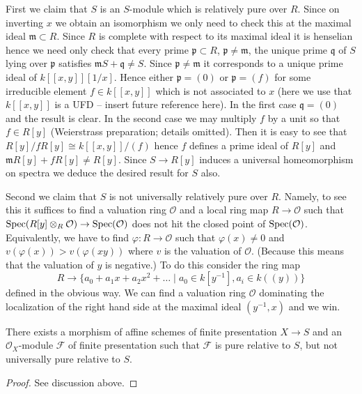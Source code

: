 \medskip\noindent
First we claim that $S$ is an $S$-module which is relatively pure
over $R$. Since on inverting $x$ we obtain an isomorphism we only need
to check this at the maximal ideal $\mathfrak m \subset R$. Since
$R$ is complete with respect to its maximal ideal it is henselian
hence we need only check that every prime $\mathfrak p \subset R$,
$\mathfrak p \not = \mathfrak m$, the unique prime $\mathfrak q$
of $S$ lying over $\mathfrak p$ satisfies
$\mathfrak mS + \mathfrak q \not = S$. Since $\mathfrak p \not = \mathfrak m$
it corresponds to a unique prime ideal of $k[[x, y]][1/x]$. Hence
either $\mathfrak p = (0)$ or $\mathfrak p = (f)$ for some
irreducible element $f \in k[[x, y]]$ which is not associated to $x$
(here we use that $k[[x, y]]$ is a UFD -- insert future reference here).
In the first case $\mathfrak q = (0)$ and the result is clear. In the
second case we may multiply $f$ by a unit so that $f \in R[y]$
(Weierstrass preparation; details omitted). Then it is easy to see that
$R[y]/fR[y] \cong k[[x, y]]/(f)$ hence $f$ defines a prime ideal
of $R[y]$ and $\mathfrak mR[y] + fR[y] \not = R[y]$.
Since $S \to R[y]$ induces a universal homeomorphism on spectra we deduce the
desired result for $S$ also.

\medskip\noindent
Second we claim that $S$ is not universally relatively pure over $R$.
Namely, to see this it suffices to find a valuation ring
$\mathcal{O}$ and a local ring map $R \to \mathcal{O}$ such that
$\mathop{\mathrm{Spec}}(R[y] \otimes_R \mathcal{O}) \to \mathop{\mathrm{Spec}}(\mathcal{O})$
does not hit the closed point of $\mathop{\mathrm{Spec}}(\mathcal{O})$.
Equivalently, we have to find $\varphi : R \to \mathcal{O}$ such that
$\varphi(x) \not = 0$ and $v(\varphi(x)) > v(\varphi(xy))$ where $v$
is the valuation of $\mathcal{O}$.
(Because this means that the valuation of $y$ is negative.)
To do this consider the ring map
$$
R
\longrightarrow
\{a_0 + a_1 x + a_2 x^2 + \ldots \mid a_0 \in k[y^{-1}], a_i \in k((y))\}
$$
defined in the obvious way. We can find a valuation ring $\mathcal{O}$
dominating the localization of the right hand side at the maximal
ideal $(y^{-1}, x)$ and we win.

\begin{lemma}
\label{lemma-pure-not-universally-pure}
There exists a morphism of affine schemes of finite presentation
$X \to S$ and an $\mathcal{O}_X$-module $\mathcal{F}$ of finite presentation
such that $\mathcal{F}$ is pure relative to $S$, but not universally
pure relative to $S$.
\end{lemma}

\begin{proof}
See discussion above.
\end{proof}



